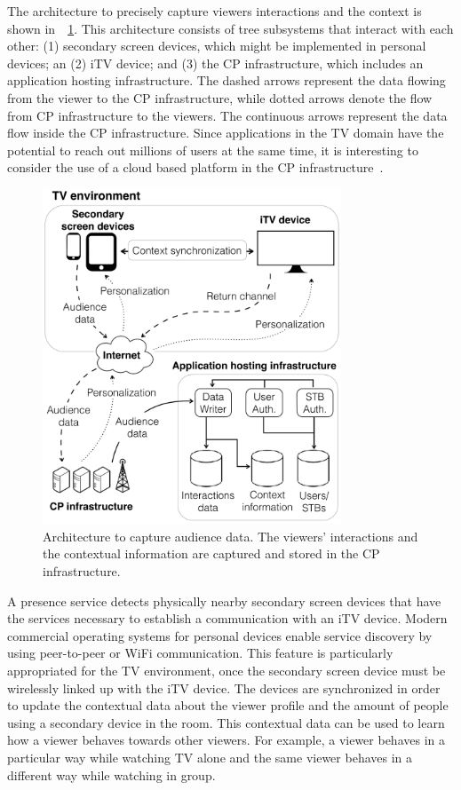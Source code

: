\documentclass[journal]{IEEEtran}
\begin{document}
The architecture to precisely capture viewers interactions and the context is shown in~\figurename~\ref{fig_architecture}. This architecture consists of tree subsystems that interact with each other: (1) secondary screen devices, which might be implemented in personal devices; an (2) iTV device; and (3) the CP infrastructure, which includes an application hosting infrastructure. The dashed arrows represent the data flowing from the viewer to the CP infrastructure, while dotted arrows denote the flow from CP infrastructure to the viewers. The continuous arrows represent the data flow inside the CP infrastructure. Since applications in the TV domain have the potential to reach out millions of users at the same time, it is interesting to consider the use of a cloud based platform in the CP infrastructure~\cite{Lee2010}. 

\begin{figure}[!t]
	\centering
	\includegraphics[width=3.5in]{img/architecture.pdf}
	\caption{Architecture to capture audience data. The viewers' interactions and the contextual information are captured and stored in the CP infrastructure.}
	\label{fig_architecture}
\end{figure}

A presence service detects physically nearby secondary screen devices that have the services necessary to establish a communication with an iTV device. Modern commercial operating systems for personal devices enable service discovery by using peer-to-peer or WiFi communication. This feature is particularly appropriated for the TV environment, once the secondary screen device must be wirelessly linked up with the iTV device. The devices are synchronized in order to update the contextual data about the viewer profile and the amount of people using a secondary device in the room. This contextual data can be used to learn how a viewer behaves towards other viewers. For example, a viewer behaves in a particular way while watching TV alone and the same viewer behaves in a different way while watching in group.
\end{document}
